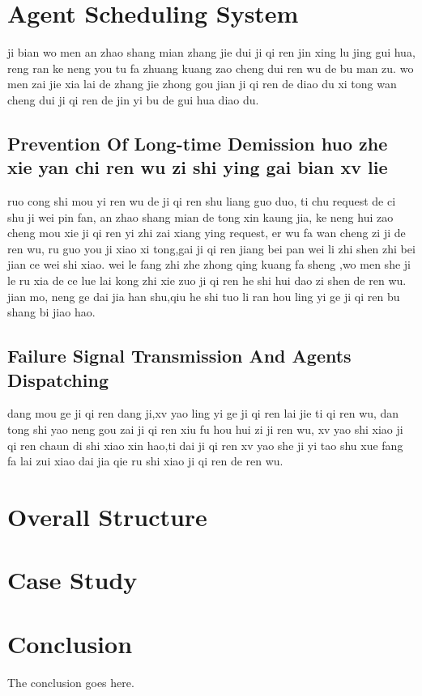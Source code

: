 \documentclass[journal]{IEEEtran}
\begin{document}
\section{Agent Scheduling System}
ji bian wo men an zhao shang mian zhang jie dui ji qi ren jin xing lu jing gui hua, reng ran ke neng you tu fa zhuang kuang zao cheng dui ren wu de bu man zu. wo men zai jie xia lai de zhang jie zhong gou jian ji qi ren de diao du xi tong wan cheng dui ji qi ren de jin yi bu de gui hua diao du.
\subsection{Prevention Of Long-time Demission huo zhe xie yan chi ren wu zi shi ying gai bian xv lie}
ruo cong shi mou yi ren wu de ji qi ren shu liang guo duo, ti chu request de ci shu ji wei pin fan, an zhao shang mian de tong xin kaung jia, ke neng hui zao cheng mou xie ji qi ren yi zhi zai xiang ying request, er wu fa wan cheng zi ji de ren wu, ru guo you ji xiao xi tong,gai ji qi ren jiang bei pan wei li zhi shen zhi bei jian ce wei shi xiao. wei le fang zhi zhe zhong qing kuang fa sheng ,wo men she ji le ru xia de ce lue lai kong zhi xie zuo ji qi ren he shi hui dao zi shen de ren wu.   jian mo, neng ge dai jia han shu,qiu he shi tuo li ran hou ling yi ge ji qi ren bu shang bi jiao hao.
\subsection{Failure Signal Transmission And Agents Dispatching}
dang mou ge ji qi ren dang ji,xv yao ling yi ge ji qi ren lai jie ti qi ren wu, dan tong shi yao neng gou zai ji qi ren xiu fu hou hui zi ji ren wu, xv yao shi xiao ji qi ren chaun di shi xiao xin hao,ti dai ji qi ren xv yao she ji yi tao shu xue fang fa lai zui xiao dai jia qie ru shi xiao ji qi ren de ren wu.
\section{Overall Structure}

\section{Case Study}

\section{Conclusion}
The conclusion goes here.
\end{document}
